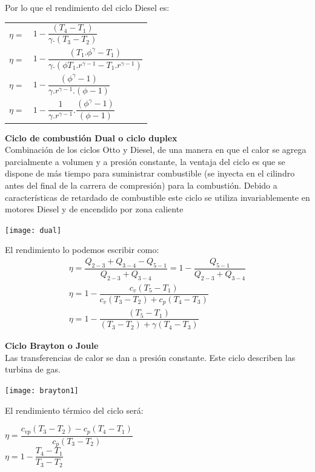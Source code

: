 \documentclass[11pt,a4paper,twocolumn]{article}
\begin{document}
	Por lo que el rendimiento del ciclo Diesel es:
	\begin{center}
		\begin{tabular}{ r l }
		$ \eta =$&$ 1 -\dfrac{(T_{4}-T_{1})}{\gamma.(T_{3}-T_{2})}$\\[16pt]
		
		$ \eta =$&$1 -\dfrac{(T_{1}.\phi^{\gamma}-T_{1})}{\gamma.( \phi T_{1}.r^{\gamma-1}-T_{1}.r^{\gamma-1})}$\\[16pt]
		
		$ \eta =$&$1 -\dfrac{(\phi^{\gamma}-1)}{\gamma.r^{\gamma-1}.( \phi -1)}$\\[16pt]
		
		$ \eta =$&$1 - \dfrac{1}{\gamma.r^{\gamma-1}} . \dfrac{(\phi^{\gamma}-1)}{( \phi -1)}$\\	
	\end{tabular}
	\end{center}
		\textbf{Ciclo de combustión Dual o ciclo duplex}\\
	Combinación de los ciclos Otto y Diesel, de una manera en que el calor se agrega parcialmente a volumen y a presión constante, la ventaja del ciclo es que se dispone de más tiempo para suministrar combustible (se inyecta en el cilindro antes del final de la carrera de compresión) para la combustión. Debido a características de retardado de combustible este ciclo se utiliza invariablemente en motores Diesel y de encendido por zona caliente
	\begin{center}
		\texttt{[image: dual]}
	\end{center}

	El rendimiento lo podemos escribir como:
	\begin{gather*}
		\eta =  \dfrac{Q_{2-3}+Q_{3-4}-Q_{5-1}}{Q_{2-3}+Q_{3-4}} = 1- \dfrac{Q_{5-1}}{Q_{2-3}+Q_{3-4}} \\
		\eta= 1- \dfrac{c_{v}(T_{5}-T_{1})}{c_{v}(T_{3}-T_{2})+c_{p}(T_{4}-T_{3})}\\
		\eta=1- \dfrac{(T_{5}-T_{1})}{(T_{3}-T_{2})+\gamma(T_{4}-T_{3})}
	\end{gather*}

	\textbf{Ciclo Brayton o Joule}\\
	Las transferencias de calor se dan a presión constante. Este ciclo describen las turbina de gas.
	\begin{center}
		\texttt{[image: brayton1]}
	\end{center}
	El rendimiento térmico del ciclo será:
	\begin{center}
		$\eta= \dfrac{c_{vp}(T_{3}-T_{2})-c_{p}(T_{4}-T_{1})}{c_{p}(T_{3}-T_{2})}$\\ \vspace{0.2cm}
		$\eta=1-\dfrac{T_{4}-T_{1}}{T_{3}-T_{2}}$\\
	\end{center}
\end{document}
